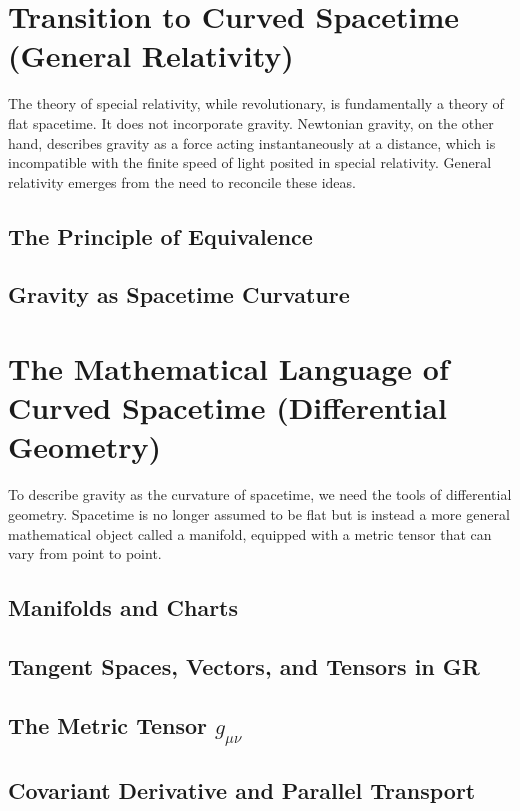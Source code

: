 \documentclass{amsart}
\theoremstyle{definition}
\theoremstyle{remark}
\begin{document}
\section{Transition to Curved Spacetime (General Relativity)}
\label{sec:transition_gr}
The theory of special relativity, while revolutionary, is fundamentally a theory of flat spacetime.
It does not incorporate gravity.
Newtonian gravity, on the other hand, describes gravity as a force acting instantaneously at a distance, which is incompatible with the finite speed of light posited in special relativity.
General relativity emerges from the need to reconcile these ideas.

\subsection{The Principle of Equivalence}

\subsection{Gravity as Spacetime Curvature}

\section{The Mathematical Language of Curved Spacetime (Differential Geometry)}
\label{sec:math_gr}
To describe gravity as the curvature of spacetime, we need the tools of differential geometry.
Spacetime is no longer assumed to be flat but is instead a more general mathematical object called a manifold, equipped with a metric tensor that can vary from point to point.
\subsection{Manifolds and Charts}
\subsection{Tangent Spaces, Vectors, and Tensors in GR}
\subsection{The Metric Tensor $g_{\mu\nu}$}
\subsection{Covariant Derivative and Parallel Transport}
\end{document}
